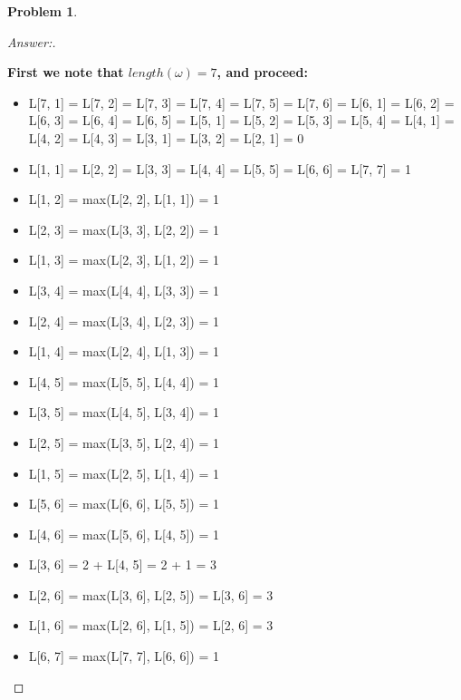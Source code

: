 \documentclass[11pt]{article}
\theoremstyle{definition}
\theoremstyle{definition}
\newtheorem{required}{Problem}
\theoremstyle{definition}
\begin{document}
\begin{required}
\begin{enumerate}[label=(\alph*)]
\begin{proof}[Answer:] \
\item \textbf{First we note that $length(\omega) = 7$, and proceed:}
\begin{itemize}
\item L[7, 1] = L[7, 2] = L[7, 3] = L[7, 4] = L[7, 5] = L[7, 6] = L[6, 1] = L[6, 2] = L[6, 3] = L[6, 4] = L[6, 5] = L[5, 1] = L[5, 2] = L[5, 3] = L[5, 4] = L[4, 1] = L[4, 2] = L[4, 3] = L[3, 1] = L[3, 2] = L[2, 1] = \color{red} 0 \color{black} \\
\item L[1, 1] = L[2, 2] = L[3, 3] = L[4, 4] = L[5, 5] = L[6, 6] = L[7, 7] = \color{red} 1 \color{black} \\
\item L[1, 2] = max(L[2, 2], L[1, 1]) = \color{red} 1 \color{black} \\
\item L[2, 3] = max(L[3, 3], L[2, 2]) = \color{red} 1 \color{black}
\item L[1, 3] = max(L[2, 3], L[1, 2]) = \color{red} 1 \color{black} \\
\item L[3, 4] = max(L[4, 4], L[3, 3]) = \color{red} 1 \color{black}
\item L[2, 4] = max(L[3, 4], L[2, 3]) = \color{red} 1 \color{black}
\item L[1, 4] = max(L[2, 4], L[1, 3]) = \color{red} 1 \color{black} \\
\item L[4, 5] = max(L[5, 5], L[4, 4]) = \color{red} 1 \color{black}
\item L[3, 5] = max(L[4, 5], L[3, 4]) = \color{red} 1 \color{black}
\item L[2, 5] = max(L[3, 5], L[2, 4]) = \color{red} 1 \color{black}
\item L[1, 5] = max(L[2, 5], L[1, 4]) = \color{red} 1 \color{black} \\
\item L[5, 6] = max(L[6, 6], L[5, 5]) = \color{red} 1 \color{black} 
\item L[4, 6] = max(L[5, 6], L[4, 5]) = \color{red} 1 \color{black}
\item L[3, 6] = 2 + L[4, 5] = 2 + 1 = \color{red} 3 \color{black}
\item L[2, 6] = max(L[3, 6], L[2, 5]) = L[3, 6] = \color{red} 3 \color{black}
\item L[1, 6] = max(L[2, 6], L[1, 5]) = L[2, 6] = \color{red} 3 \color{black} \\
\item L[6, 7] = max(L[7, 7], L[6, 6]) = \color{red} 1 \color{black}

\end{itemize}
\end{proof}
\end{enumerate}
\end{required}
\end{document}
